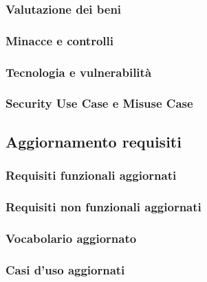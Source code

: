 \documentclass{article}
\begin{document}
\subsubsection {Valutazione dei beni}

\subsubsection {Minacce e controlli}

\subsubsection{Tecnologia e vulnerabilità}

\subsubsection{Security Use Case e Misuse Case}


\subsection{Aggiornamento requisiti}
\subsubsection{Requisiti funzionali aggiornati}

\subsubsection{Requisiti non funzionali aggiornati}

\subsubsection{Vocabolario aggiornato}

\subsubsection{Casi d'uso aggiornati}

\end{document}
